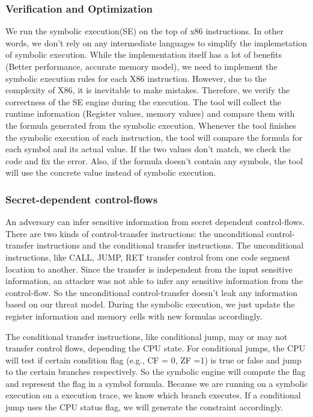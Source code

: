 \subsubsection{Verification and Optimization}
We run the symbolic execution(SE) on the top of x86 instructions.
In other words, we don’t rely on any intermediate languages to 
simplify the implemetation of symbolic execution. 
While the implementation itself 
has a lot of benefits (Better performance, accurate memory model), 
we need to implement the symbolic execution 
rules for each X86 instruction. 
However, due to the complexity of X86, it is inevitable to make mistakes. 
Therefore, we verify the correctness of the SE engine during the execution. 
The tool will collect the runtime information (Register values, 
memory values) and compare them with the formula generated from the 
symbolic execution. Whenever the tool finishes the symbolic execution 
of each instruction, the tool will compare the formula for each symbol 
and its actual value. If the two values don’t match, we check the code
and fix the error. Also, if the formula doesn’t contain any symbols,
the tool will use the concrete value instead of symbolic execution.

\subsubsection{Secret-dependent control-flows}
An adversary can infer sensitive information from secret dependent control-flows. 
There are two kinds of control-transfer instructions: the unconditional 
control-transfer instructions and the conditional transfer instructions.
The unconditional instructions, like CALL, JUMP, RET transfer control
from one code segment location to another. Since the transfer is 
independent from the input sensitive information, an attacker was 
not able to infer any sensitive information from the control-flow. 
So the unconditional control-transfer doesn’t leak any information 
based on our threat model. During the symbolic execution, 
we just update the register information and memory cells with 
new formulas accordingly.

The conditional transfer instructions, like conditional jump, may or 
may not transfer control flows, depending the CPU state. For conditional 
jumps, the CPU will test if certain condition flag (e.g., CF = 0, ZF =1) 
is true or false and jump to the certain branches respectively.
So the symbolic engine will compute the flag and represent the flag 
in a symbol formula. Because we are running on a symbolic execution 
on a execution trace, we know which branch executes.
If a conditional jump uses the CPU status flag, we will generate 
the constraint accordingly.

